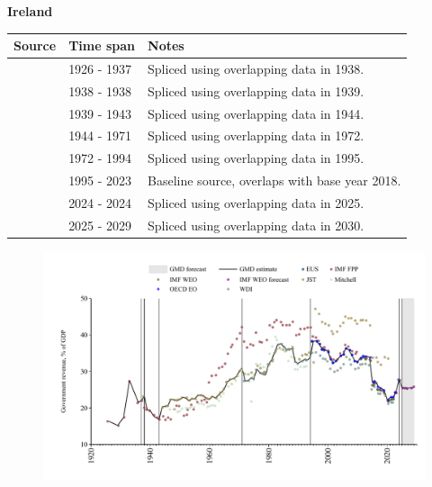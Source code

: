\documentclass[12pt,a4paper,landscape]{article}
\begin{document}
\begin{adjustbox}{max totalsize={\paperwidth}{\paperheight},center}
\begin{minipage}[t][\textheight][t]{\textwidth}
\vspace*{0.5cm}
{}
\begin{center}
{\Large\bfseries Ireland}
\end{center}
\vspace{0.5cm}
\begin{table}[H]
\centering
\small
\begin{tabular}{|l|l|l|}
\hline
\textbf{Source} & \textbf{Time span} & \textbf{Notes} \\
\hline
\rowcolor{white}\cite{IMF_FPP}& 1926 - 1937 &Spliced using overlapping data in 1938.\\
\rowcolor{lightgray}\cite{JST}& 1938 - 1938 &Spliced using overlapping data in 1939.\\
\rowcolor{white}\cite{IMF_FPP}& 1939 - 1943 &Spliced using overlapping data in 1944.\\
\rowcolor{lightgray}\cite{JST}& 1944 - 1971 &Spliced using overlapping data in 1972.\\
\rowcolor{white}\cite{WDI}& 1972 - 1994 &Spliced using overlapping data in 1995.\\
\rowcolor{lightgray}\cite{OECD_EO}& 1995 - 2023 &Baseline source, overlaps with base year 2018.\\
\rowcolor{white}\cite{EUS}& 2024 - 2024 &Spliced using overlapping data in 2025.\\
\rowcolor{lightgray}\cite{IMF_WEO_forecast}& 2025 - 2029 &Spliced using overlapping data in 2030.\\
\hline
\end{tabular}
\end{table}
\begin{figure}[H]
\centering
\includegraphics[width=\textwidth,height=0.6\textheight,keepaspectratio]{graphs/IRL_govrev_GDP.pdf}
\end{figure}
\end{minipage}
\end{adjustbox}
\end{document}
